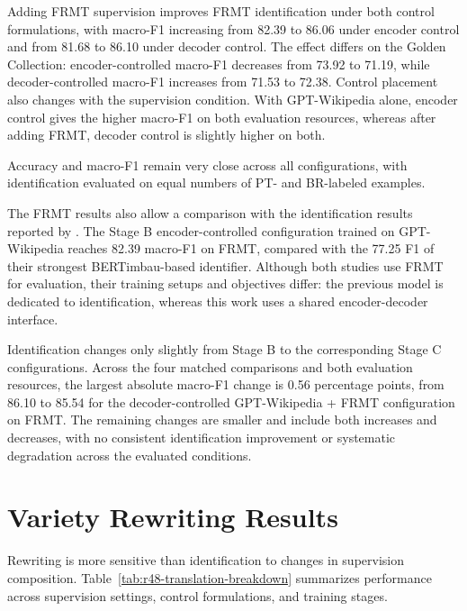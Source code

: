Adding FRMT supervision improves FRMT identification under both control
formulations, with macro-F1 increasing from 82.39 to 86.06 under encoder control
and from 81.68 to 86.10 under decoder control. The effect differs on the Golden
Collection: encoder-controlled macro-F1 decreases from 73.92 to 71.19, while
decoder-controlled macro-F1 increases from 71.53 to 72.38. Control placement
also changes with the supervision condition. With GPT-Wikipedia alone, encoder
control gives the higher macro-F1 on both evaluation resources, whereas after
adding FRMT, decoder control is slightly higher on both.

Accuracy and macro-F1 remain very close across all configurations, with
identification evaluated on equal numbers of PT- and BR-labeled examples.

The FRMT results also allow a comparison with the identification results
reported by \citet{sousa2025enhancingportuguesevarietyidentification}. The Stage
B encoder-controlled configuration trained on GPT-Wikipedia reaches 82.39
macro-F1 on FRMT, compared with the 77.25 F1 of their strongest
BERTimbau-based identifier. Although both studies use FRMT for evaluation,
their training setups and objectives differ: the previous model is dedicated
to identification, whereas this work uses a shared encoder-decoder interface.

Identification changes only slightly from Stage B to the corresponding Stage C
configurations. Across the four matched comparisons and both evaluation
resources, the largest absolute macro-F1 change is 0.56 percentage points, from
86.10 to 85.54 for the decoder-controlled GPT-Wikipedia + FRMT configuration on
FRMT. The remaining changes are smaller and include both increases and
decreases, with no consistent identification improvement or systematic
degradation across the evaluated conditions.

\section{Variety Rewriting Results}
\label{sec:rewriting-results}

Rewriting is more sensitive than identification to changes in supervision
composition. Table~\ref{tab:r48-translation-breakdown} summarizes performance
across supervision settings, control formulations, and training
stages.

